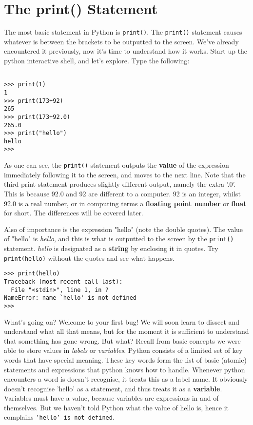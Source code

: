 \section{The print() Statement}

The most basic statement in Python is \texttt{print()}. The \texttt{print()}   statement causes whatever is between the brackets to be outputted to the screen.   We've already encountered it previously, now it's time to understand   how it works. Start up the python interactive shell, and let's explore.   Type the following:
\begin{lstlisting}

>>> print(1)
1
>>> print(173+92)
265
>>> print(173+92.0)
265.0
>>> print("hello")
hello
>>>
\end{lstlisting}

As one can see, the \texttt{print()} statement outputs the   \textbf{value} of the expression immediately following it to   the screen, and moves to the next line. Note that the third print   statement produces slightly different output, namely the extra '.0'.   This is because 92.0 and 92 are different to a computer. 92 is an   integer, whilst 92.0 is a real number, or in computing terms a   \textbf{floating point number} or \textbf{float} for short. The   differences will be covered later.

Also of importance is the expression "hello" (note the double   quotes). The value of "hello" is \textit{hello}, and this is what is   outputted to the screen by the \texttt{print()} statement. \textit{hello} is   designated as a \textbf{string} by enclosing it in quotes. Try   
\texttt{print(hello)} without the quotes and see what happens.
\begin{lstlisting}
>>> print(hello)
Traceback (most recent call last):
  File "<stdin>", line 1, in ?
NameError: name `hello' is not defined
>>>
\end{lstlisting}

What's going on? Welcome to your first bug! We will soon learn to dissect and   understand what all that means, but for the moment it is sufficient to   understand that something has gone wrong. But what? Recall from basic   concepts we were able to store values in \textit{labels} or \textit{variables}.   Python consists of a limited set of key words that have special   meaning. These key words form the list of basic (atomic) statements and   expressions that python knows how to handle. Whenever python encounters   a word is doesn't recognise, it treats this as a label name. It   obviously doesn't recognise 'hello' as a statement, and thus treats it as   a \textbf{variable}. Variables must have a value, because   variables are expressions in and of themselves. But we haven't told   Python what the value of hello is, hence it complains \texttt{'hello' is not defined}.

